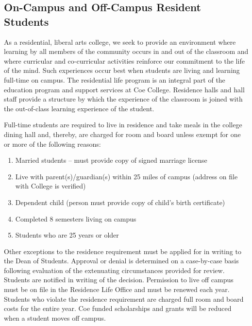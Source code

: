 \documentclass[
  letterpaper,
]{scrbook}
\providecommand{\tightlist}{%
  \setlength{\itemsep}{0pt}\setlength{\parskip}{0pt}}
\begin{document}
\subsection{On-Campus and Off-Campus Resident
Students}\label{sec-full-time-residence-requirements}

As a residential, liberal arts college, we seek to provide an
environment where learning by all members of the community occurs in and
out of the classroom and where curricular and co-curricular activities
reinforce our commitment to the life of the mind. Such experiences occur
best when students are living and learning full-time on campus. The
residential life program is an integral part of the education program
and support services at Coe College. Residence halls and hall staff
provide a structure by which the experience of the classroom is joined
with the out-of-class learning experience of the student.

Full-time students are required to live in residence and take meals in
the college dining hall and, thereby, are charged for room and board
unless exempt for one or more of the following reasons:

\begin{enumerate}
\def\labelenumi{\arabic{enumi}.}
\tightlist
\item
  Married students -- must provide copy of signed marriage license\\
\item
  Live with parent(s)/guardian(s) within 25 miles of campus (address on
  file with College is verified)\\
\item
  Dependent child (person must provide copy of child's birth
  certificate)\\
\item
  Completed 8 semesters living on campus\\
\item
  Students who are 25 years or older
\end{enumerate}

Other exceptions to the residence requirement must be applied for in
writing to the Dean of Students. Approval or denial is determined on a
case-by-case basis following evaluation of the extenuating circumstances
provided for review. Students are notified in writing of the decision.
Permission to live off campus must be on file in the Residence Life
Office and must be renewed each year. Students who violate the residence
requirement are charged full room and board costs for the entire year.
Coe funded scholarships and grants will be reduced when a student moves
off campus.
\end{document}
